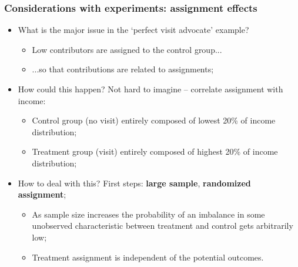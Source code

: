 \documentclass[aspectratio=169]{beamer}
\theoremstyle{principle}
\begin{document}
\begin{frame}
\frametitle{Considerations with experiments: assignment effects}
\begin{itemize}
\item What is the major issue in the `perfect visit advocate' example?
\begin{itemize}
\item Low contributors are assigned to the control group...
\item ...so that contributions are related to assignments;
 \end{itemize}
\bigskip
\item How could this happen?  Not hard to imagine -- correlate assignment with income:
\begin{itemize}
\item Control group (no visit) entirely composed of lowest 20\% of income distribution;
\item Treatment group (visit) entirely composed of highest 20\% of income distribution;
\end{itemize}
\bigskip
\item How to deal with this?  First steps: \textbf{large sample}, \textbf{randomized assignment};
\begin{itemize}
\item As sample size increases the probability of an imbalance in some unobserved characteristic between treatment and control gets arbitrarily low;
\item Treatment assignment is independent of the potential outcomes.
\end{itemize}
\end{itemize}
\end{frame}
\end{document}
